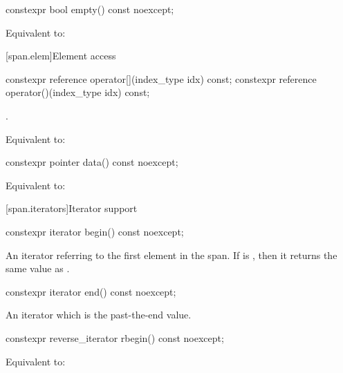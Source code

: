 %
\begin{itemdecl}
constexpr bool empty() const noexcept;
\end{itemdecl}
\begin{itemdescr}
\pnum
\effects
Equivalent to: 
\end{itemdescr}

[span.elem]{Element access}

%
%
\begin{itemdecl}
constexpr reference operator[](index_type idx) const;
constexpr reference operator()(index_type idx) const;
\end{itemdecl}
\begin{itemdescr}
\pnum
\requires
{}.

\pnum
\effects
Equivalent to: 
\end{itemdescr}

%
\begin{itemdecl}
constexpr pointer data() const noexcept;
\end{itemdecl}
\begin{itemdescr}
\pnum
\effects
Equivalent to: 
\end{itemdescr}

[span.iterators]{Iterator support}

%
\begin{itemdecl}
constexpr iterator begin() const noexcept;
\end{itemdecl}
\begin{itemdescr}
\pnum
\returns
An iterator referring to the first element in the span.
If  is , then it returns the
same value as .
\end{itemdescr}

%
\begin{itemdecl}
constexpr iterator end() const noexcept;
\end{itemdecl}
\begin{itemdescr}
\pnum
\returns
An iterator which is the past-the-end value.
\end{itemdescr}

%
\begin{itemdecl}
constexpr reverse_iterator rbegin() const noexcept;
\end{itemdecl}
\begin{itemdescr}
\pnum
\effects
Equivalent to: 
\end{itemdescr}

